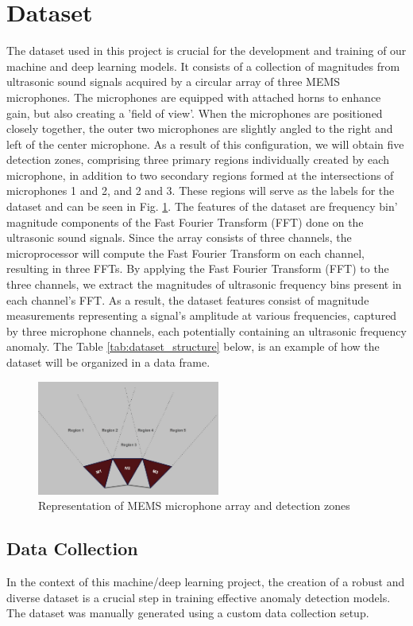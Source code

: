 \documentclass[conference]{IEEEtran}
\begin{document}
\section{Dataset} %
The dataset used in this project is crucial for the development and training of our machine and deep learning models. It consists of a collection of magnitudes from ultrasonic sound signals acquired by a circular array of three MEMS microphones. The microphones are equipped with attached horns to enhance gain, but also creating a 'field of view'. When the microphones are positioned closely together, the outer two microphones are slightly angled to the right and left of the center microphone. As a result of this configuration, we will obtain five detection zones, comprising three primary regions individually created by each microphone, in addition to two secondary regions formed at the intersections of microphones 1 and 2, and 2 and 3. These regions will serve as the labels for the dataset and can be seen in Fig. \ref{fig1}.
The features of the dataset are frequency bin' magnitude components of the Fast Fourier Transform (FFT) done on the ultrasonic sound signals. Since the array consists of three channels, the microprocessor will compute the Fast Fourier Transform on each channel, resulting in three FFTs. By applying the Fast Fourier Transform (FFT) to the three channels, we extract the magnitudes of ultrasonic frequency bins present in each channel's FFT. As a result, the dataset features consist of magnitude measurements representing a signal's amplitude at various frequencies, captured by three microphone channels, each potentially containing an ultrasonic frequency anomaly. The Table \ref{tab:dataset_structure} below, is an example of how the dataset will be organized in a data frame.
\begin{figure}[htbp]
    \centering
    \includegraphics[width=6cm]{figs/nn/setchregions.png} %
    \caption{Representation of MEMS microphone array and detection zones}
    \label{fig1}
\end{figure}
\subsection{Data Collection}
In the context of this machine/deep learning project, the creation of a robust and diverse dataset is a crucial step in training effective anomaly detection models. The dataset was manually generated using a custom data collection setup.
\end{document}
